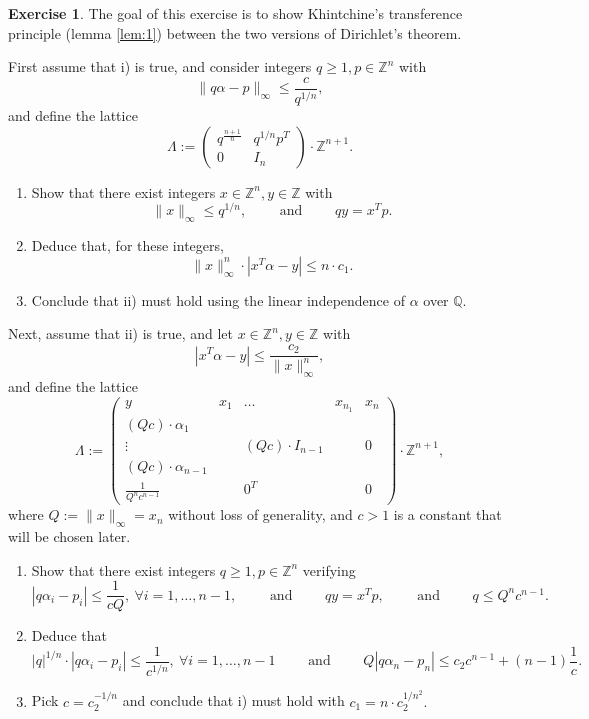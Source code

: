 \documentclass[12pt,a4paper]{article}
\theoremstyle{plain}
\newtheorem*{Sol*}{Solution}
\theoremstyle{definition}
\newtheorem{Ex}{Exercise}
\def \Q {\mathbb Q}
\def \Z {\mathbb Z}
\newif\ifsolutions
\newcommand{\exercise}[2]{
			\begin{Ex} #1 \end{Ex}
			\ifsolutions  \begin{Sol*} #2 \end{Sol*} \bigskip \else \bigskip  \fi
		}
\begin{document}
\exercise{
	The goal of this exercise is to show Khintchine's transference principle (lemma \ref{lem:1}) between the two versions of Dirichlet's theorem.

	First assume that i) is true, and consider integers $q \geq 1, p \in \Z^n$ with
		\[ \| q \alpha - p \|_\infty \leq \frac{c}{q^{1/n}}, \]
	and define the lattice 
		\[ \Lambda := \begin{pmatrix} q^{\frac{n+1}n} & q^{1/n} p^T \\ 0 & I_n \end{pmatrix} \cdot \Z^{n+1}.\]

	\begin{enumerate}
		\item Show that there exist integers $x \in \Z^n, y \in \Z$ with
			\[ \| x \|_\infty \leq q^{1/n}, \qquad \text{ and } \qquad qy = x^Tp.\]
		\item Deduce that, for these integers,
			\[  \| x \|_\infty^n \cdot | x^T \alpha - y | \leq n \cdot c_1. \]
		\item Conclude that ii) must hold using the linear independence of $\alpha$ over $\Q$.
	\end{enumerate}

	Next, assume that ii) is true, and let $x \in \Z^n, y \in \Z$ with
		\[ | x^T \alpha - y | \leq \frac{c_2}{ \| x \|_\infty^n}, \]
	and define the lattice 
		\[ \Lambda := \begin{pmatrix}
					y & x_1 & \dots & x_{n_1} & x_n \\
					(Qc)\cdot\alpha_1 & & & & \\
					\vdots & & (Qc) \cdot I_{n-1} & & 0 \\
					(Qc)\cdot\alpha_{n-1} & & & & \\
					 \frac{1}{Q^n c^{n-1}} & & 0^T & & 0 
					\end{pmatrix} \cdot \Z^{n+1},\]
	where $Q := \| x \|_\infty = x_n$ without loss of generality, and $c > 1$ is a constant that will be chosen later.

	\begin{enumerate}
		\item Show that there exist integers $q \geq 1, p \in \Z^n$ verifying
			\[ | q \alpha_i - p_i | \leq \frac{1}{cQ}, \ \forall i=1, \dots, n-1, \qquad \text{ and } \qquad qy = x^Tp, \qquad \text{ and } \qquad q \leq Q^n c^{n-1}. \]
		\item Deduce that 
			\[ |q|^{1/n} \cdot | q \alpha_i - p_i | \leq \frac{1}{c^{1/n}}, \ \forall i=1, \dots, n-1 \qquad \text{ and } \qquad Q | q \alpha_n - p_n| \leq c_2 c^{n-1} + (n-1)\frac1c.\]
		\item Pick $c = c_2^{-1/n}$ and conclude that i) must hold with $c_1 = n \cdot c_2^{1/n^2}.$
	\end{enumerate}
}
{}
\end{document}
